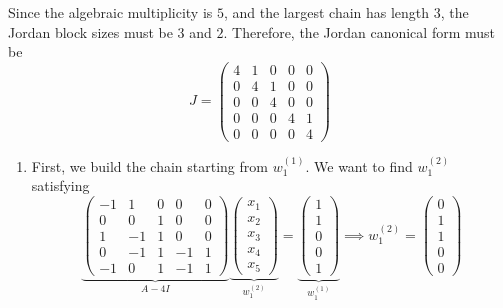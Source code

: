 \begin{example}
		Since the algebraic multiplicity is $5$, and the largest chain has length $3$, the Jordan block sizes must be $3$ and $2$. Therefore, the Jordan canonical form must be
		\begin{equation}
			J = \begin{pmatrix}
				4 & 1 & 0 & 0 & 0 \\
				0 & 4 & 1 & 0 & 0 \\
				0 & 0 & 4 & 0 & 0 \\
				0 & 0 & 0 & 4 & 1 \\
				0 & 0 & 0 & 0 & 4
			\end{pmatrix}
		\end{equation}

		\begin{enumerate}
			\item First, we build the chain starting from $w_1^{(1)}$. We want to find $w_1^{(2)}$ satisfying
				\begin{equation}
					\underbrace{\begin{pmatrix}
						-1 & 1 & 0 & 0 & 0 \\
						0 & 0 & 1 & 0 & 0 \\
						1 & -1 & 1 & 0 & 0 \\
						0 & -1 & 1 & -1 & 1 \\
						-1 & 0 & 1 & -1 & 1
					\end{pmatrix}}_{A - 4I} \underbrace{\begin{pmatrix} x_1 \\ x_2 \\ x_3 \\ x_4 \\ x_5 \end{pmatrix}}_{w_1^{(2)}} = \underbrace{\begin{pmatrix} 1 \\ 1 \\ 0 \\ 0 \\ 1 \end{pmatrix}}_{w_1^{(1)}} \implies w_1^{(2)} = \begin{pmatrix} 0 \\ 1 \\ 1 \\ 0 \\ 0 \end{pmatrix}
				\end{equation}


\end{enumerate}
\end{example}
